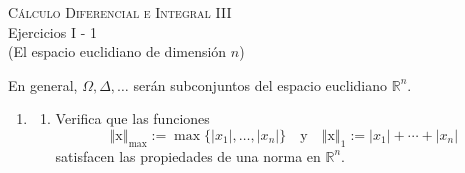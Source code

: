 \documentclass[12pt]{article}
\newcommand{\abs}[1]{\left\vert#1\right\vert}
\newcommand{\norm}[1]{\left\Vert#1\right\Vert}
\newcommand{\R}{\mathbb R}
\newcommand{\x}{\mathrm x}
\begin{document}
\pagestyle{empty}
\begin{center}
{\textsc{Cálculo Diferencial e Integral III} \\
\medskip 
\large{Ejercicios I - 1 \\
(El espacio euclidiano de dimensión $n$)}}
\end{center}
\bigskip

En general, $\Omega,\Delta, \dots$ serán subconjuntos del espacio euclidiano $\R^n$.

\begin{enumerate}

\item 
\begin{enumerate}[(1)]
\item Verifica que las funciones
\[ 
\norm{\x}_{\max} := \max\{\abs{x_1},\ldots,\abs{x_n}\} \quad \text{y}\quad 
\norm{\x}_1 := \abs{x_1} + \cdots + \abs{x_n} 
\]
satisfacen las propiedades de una norma en $\R^n$.


\end{enumerate}
\end{enumerate}
\end{document}
